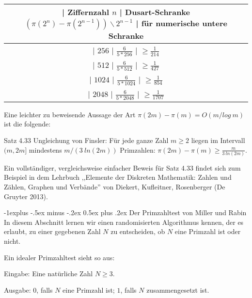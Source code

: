\documentclass[a4paper]{article}
\makeatletter
\renewcommand{\subsection}{\@startsection{subsection}{2}{0mm}%
 {-1explus -.5ex minus -.2ex}%
 {0.5ex plus .2ex}%
 {\normalfont\normalsize\bfseries}}
\makeatother
\begin{document}
\begin{multicols}{3}
        \begin{tabular}{c}
        | Ziffernzahl $n$ | Dusart-Schranke $(\pi(2^n)-\pi(2^{n-1}))\backslash 2^{n-1}$ | für numerische untere Schranke \\\hline
        | $256$      | $\frac{6}{5*256}$                      | $\geq \frac{1}{214}$      \\
        | $512$      | $\frac{6}{5*512}$                      | $\geq \frac{1}{427}$      \\
        | $1024$     | $\frac{6}{5*1024}$                     | $\geq\frac{1}{854}$      \\
        | $2048$     | $\frac{6}{5*2048}$                     | $\geq\frac{1}{1707}$      
        \end{tabular}

        Eine leichter zu beweisende Aussage der Art $\pi(2m)-\pi(m) = O(m/log\ m)$ ist die folgende:

        Satz 4.33 Ungleichung von Finsler: Für jede ganze Zahl $m\geq 2$ liegen im Intervall $(m, 2m]$ mindestens $m/(3\ ln(2m))$ Primzahlen: $\pi (2m)-\pi(m)\geq \frac{m}{3\ ln(2m)}$.

        Ein vollständiger, vergleichsweise einfacher Beweis für Satz 4.33 findet sich zum Beispiel in dem Lehrbuch ,,Elemente der Diskreten Mathematik: Zahlen und Zählen, Graphen und Verbände'' von Diekert, Kufleitner, Rosenberger (De Gruyter 2013).

        \subsection{Der Primzahltest von Miller und Rabin}
        In diesem Abschnitt lernen wir einen randomisierten Algorithmus kennen, der es erlaubt, zu einer gegebenen Zahl $N$ zu entscheiden, ob $N$ eine Primzahl ist oder nicht.

        Ein idealer Primzahltest sieht so aus:
        \begin{itemize*}
            \item Eingabe: Eine natürliche Zahl $N\geq 3$.
            \item Ausgabe: $0$, falls $N$ eine Primzahl ist; $1$, falls $N$ zusammengesetzt ist.
        \end{itemize*}


\end{multicols}
\end{document}
